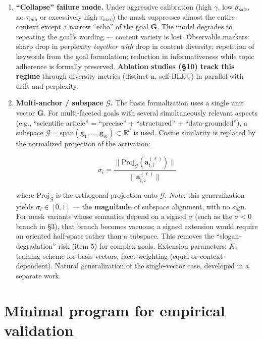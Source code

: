 \documentclass[12pt,a4paper]{article}
\begin{document}
\begin{enumerate}
    \item \textbf{``Collapse'' failure mode.} Under aggressive calibration (high $\gamma$, low $\sigma_{\text{safe}}$, no $\tau_{\min}$ or excessively high $\tau_{\max}$) the mask suppresses almost the entire context except a narrow ``echo'' of the goal $\mathbf{G}$. The model degrades to repeating the goal's wording --- content variety is lost. Observable markers: sharp drop in perplexity \textit{together with} drop in content diversity; repetition of keywords from the goal formulation; reduction in informativeness while topic adherence is formally preserved. \textbf{Ablation studies (\S10) track this regime} through diversity metrics (distinct-n, self-BLEU) in parallel with drift and perplexity.

    \item \textbf{Multi-anchor / subspace $\mathcal{G}$.} The basic formalization uses a single unit vector $\mathbf{G}$. For multi-faceted goals with several simultaneously relevant aspects (e.g., ``scientific article'' = ``precise'' + ``structured'' + ``data-grounded''), a subspace $\mathcal{G} = \mathrm{span}(\mathbf{g}_1, \ldots, \mathbf{g}_K) \subset \mathbb{R}^d$ is used. Cosine similarity is replaced by the normalized projection of the activation:

    \begin{equation}
    \sigma_i = \frac{\|\mathrm{Proj}_\mathcal{G}(\mathbf{a}_{t,i}^{(\ell)})\|}{\|\mathbf{a}_{t,i}^{(\ell)}\|}
    \end{equation}

    where $\mathrm{Proj}_\mathcal{G}$ is the orthogonal projection onto $\mathcal{G}$. \textit{Note:} this generalization yields $\sigma_i \in [0, 1]$ --- the \textbf{magnitude} of subspace alignment, with no sign. For mask variants whose semantics depend on a signed $\sigma$ (such as the $\sigma < 0$ branch in \S3), that branch becomes vacuous; a signed extension would require an oriented half-space rather than a subspace. This removes the ``slogan-degradation'' risk (item 5) for complex goals. Extension parameters: $K$, training scheme for basis vectors, facet weighting (equal or context-dependent). Natural generalization of the single-vector case, developed in a separate work.
\end{enumerate}

\section{Minimal program for empirical validation}
\end{document}
